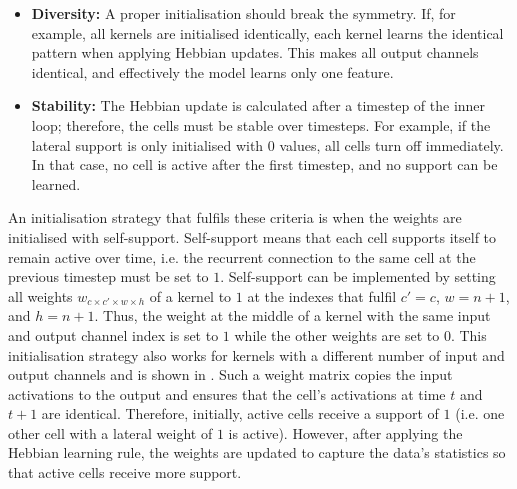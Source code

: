 \begin{itemize}
    \item \textbf{Diversity:} A proper initialisation should break the symmetry. If, for example, all kernels are initialised identically, each kernel learns the identical pattern when applying Hebbian updates. This makes all output channels identical, and effectively the model learns only one feature.
    \item \textbf{Stability:} The Hebbian update is calculated after a timestep of the inner loop; therefore, the cells must be stable over timesteps. For example, if the lateral support is only initialised with $0$ values, all cells turn off immediately. In that case, no cell is active after the first timestep, and no support can be learned.
\end{itemize}

An initialisation strategy that fulfils these criteria is when the weights are initialised with self-support.
Self-support means that each cell supports itself to remain active over time, i.e. the recurrent connection to the same cell at the previous timestep must be set to $1$.
Self-support can be implemented by setting all weights $w_{c \times c' \times w \times h}$ of a kernel to $1$ at the indexes that fulfil 
$c' = c$, $w = n+1$, and $h = n+1$. Thus, the weight at the middle of a kernel with the same input and output channel index is set to $1$ while the other weights are set to $0$. This initialisation strategy also works for kernels with a different number of input and output channels and is shown in .
Such a weight matrix copies the input activations to the output and ensures that the cell's activations at time $t$ and $t+1$ are identical. Therefore, initially, active cells receive a support of $1$ (i.e. one other cell with a lateral weight of $1$ is active).
However, after applying the Hebbian learning rule, the weights are updated to capture the data's statistics so that active cells receive more support.

